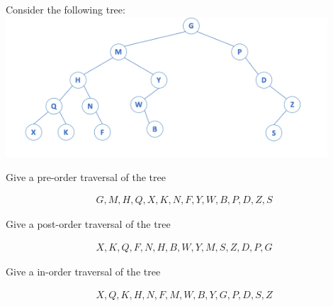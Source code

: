 \documentclass[12pt]{article}
\newenvironment{exercise}[2][Exercise]{\begin{trivlist}
\item[\hskip \labelsep {\bfseries #1}\hskip \labelsep {\bfseries #2.}]}{\end{trivlist}}
\newenvironment{sol}[1][Solution]{\begin{trivlist}
\item[\hskip\labelsep {\bfseries #1:}]}{\end{trivlist}}
\begin{document}
\begin{enumerate}
Consider the following tree:\\
    \includegraphics[width=0.9\textwidth]{image.png}

    \item Give a pre-order traversal of the tree
    \begin{sol}
        \begin{align*}
            G, M, H, Q, X, K, N, F, Y, W, B, P, D, Z, S
        \end{align*}
    \end{sol}
    
    \item Give a post-order traversal of the tree
    \begin{sol}
        \begin{align*}
            X, K, Q, F, N, H, B, W, Y, M, S, Z, D, P, G
        \end{align*}
    \end{sol}

    \item Give a in-order traversal of the tree
    \begin{sol}
        \begin{align*}
            X, Q, K, H, N, F, M, W, B, Y, G, P, D, S, Z
        \end{align*}
    \end{sol}
    
    
\end{enumerate}







 
\end{document}
